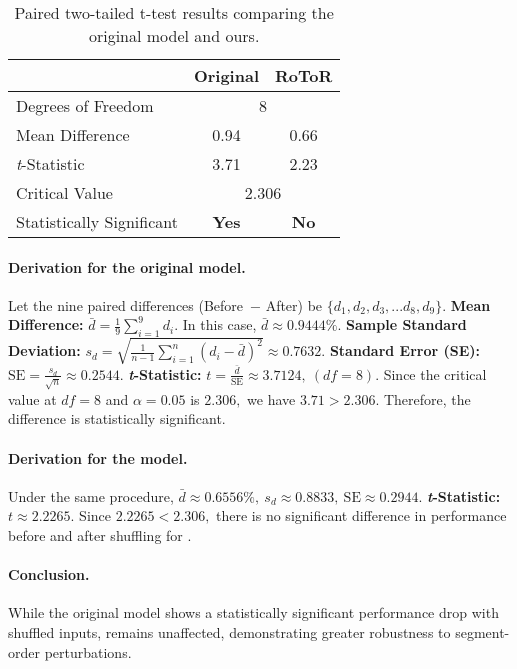 \begin{table}[ht]
\centering
\begin{tabular}{@{}l|cc@{}}
\toprule
 & \multicolumn{1}{c|}{\textbf{Original}} & \textbf{RoToR} \\ \midrule
Degrees of Freedom & \multicolumn{2}{c}{8} \\ \midrule
Mean Difference & \multicolumn{1}{c|}{0.94} & 0.66 \\ \midrule
\textit{t}-Statistic & \multicolumn{1}{c|}{3.71} & 2.23 \\ \midrule
Critical Value & \multicolumn{2}{c}{2.306} \\ \midrule
Statistically Significant & \multicolumn{1}{c|}{\textbf{Yes}} & \textbf{No} \\ \bottomrule
\end{tabular}
\caption{Paired two-tailed t-test results comparing the original model and ours.}
\label{tab:t_test_summary}
\end{table}

\paragraph{Derivation for the original model.}
Let the nine paired differences (Before~$-$ After) be \(\{d_1, d_2, d_3, ... d_8, d_9\}\).  
\textbf{Mean Difference:} $\bar{d} = \tfrac{1}{9}\sum_{i=1}^{9} d_i$. In this case, $\bar{d} \approx 0.9444\%.$  
\textbf{Sample Standard Deviation:} $s_d = \sqrt{\frac{1}{n-1}\sum_{i=1}^{n} (d_i - \bar{d})^2} \approx 0.7632.$  
\textbf{Standard Error (SE):} $\mathrm{SE} = \tfrac{s_d}{\sqrt{n}} \approx 0.2544.$  
\textbf{\textit{t}-Statistic:} $t = \tfrac{\bar{d}}{\mathrm{SE}} \approx 3.7124,\ (df=8).$  
Since the critical value at $df=8$ and $\alpha=0.05$ is $2.306,$ we have $3.71 > 2.306.$ Therefore, the difference is statistically significant.

\paragraph{Derivation for the \ours{} model.}
Under the same procedure, $\bar{d} \approx 0.6556\%,\ s_d \approx 0.8833,\ \mathrm{SE} \approx 0.2944.$  
\textbf{\textit{t}-Statistic:} $t \approx 2.2265.$ Since $2.2265 < 2.306,$ there is no significant difference in performance before and after shuffling for \ours{}.

\paragraph{Conclusion.}
While the original model shows a statistically significant performance drop with shuffled inputs, \ours{} remains unaffected, demonstrating greater robustness to segment-order perturbations.
